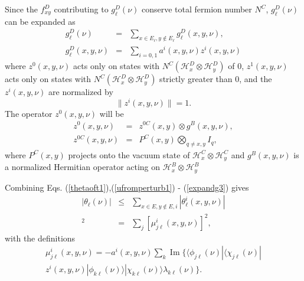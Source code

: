 \documentclass[12pt,amsmath,amssymb,onecolumn]{revtex4-2}
\begin{document}
Since the $f^D_{xy}$ contributing to $g^D_\ell(\nu)$
conserve total fermion number $N^C$,
$g^D_\ell(\nu)$ can be expanded as
\begin{subequations}
\begin{eqnarray}
\label{expandg2}
g^D_{\ell}(\nu) &=& \sum_{x \in E_\ell, y \notin E_\ell} g^D_{\ell}( x, y, \nu),\\
\label{expandg3}
g^D_{\ell}(x,y,\nu) &=& \sum_{i = 0,1} a^i(x, y, \nu) z^i(x, y, \nu)
\end{eqnarray}
\end{subequations}
where $z^0( x, y, \nu)$ acts only on states
with $N^C( \mathcal{H}^D_x \otimes \mathcal{H}^D_y)$ of 0,
$z^1( x, y, \nu)$ acts only on states
with $N^C( \mathcal{H}^D_x \otimes \mathcal{H}^D_y)$ strictly greater than 0,
and the $z^i(x,y,\nu)$ are normalized by 
\begin{equation}
\label{normzi1}
\parallel z^i(x, y, \nu) \parallel   =  1.
\end{equation}
The operator
$z^0(x, y, \nu)$ will be
\begin{subequations}
\begin{eqnarray}
\label{zprojection1}
z^0(x,y,\nu) &=& z^{0C}(x,y) \otimes g^B(x,y,\nu), \\
z^{0C}(x,y,\nu) &=& P^C(x,y) \bigotimes_{q \ne x,y} I_q,
\end{eqnarray}
\end{subequations}
where $P^C(x,y)$ projects onto the vacuum state
of $\mathcal{H}^C_x \otimes \mathcal{H}^C_y$
and $g^B(x,y,\nu)$ is a normalized Hermitian
operator acting on $\mathcal{H}^B_x \otimes \mathcal{H}^B_y$

Combining Eqs. (\ref{thetaoft1}),(\ref{ufromperturb1}) - (\ref{expandg3}) gives
\begin{subequations}
\begin{eqnarray}
\label{thetasum1}
|\theta_\ell(\nu)| &\le& \sum_{x \in E, y \notin E, i}|\theta^i_{\ell}(x,y,\nu)|\\ 
\label{defthetai1}
[\theta^i_{\ell}( x,y,\nu)]^2 & = & \sum_j [ \mu^i_{j\ell}(x,y,\nu)]^2,
\end{eqnarray}
\end{subequations}
with the definitions
\begin{multline}
\label{musupi1}
\mu^i_{j\ell}(x,y,\nu) =  -a^i(x,y,\nu) \sum_k \operatorname{Im}\{ 
 \langle \phi_{j\ell}(\nu)| \langle \chi_{j\ell}(\nu)| \\
z^i(x,y,\nu)|\phi_{k\ell}(\nu) \rangle |\chi_{k\ell}(\nu) \rangle  \lambda_{k\ell}(\nu)\}.
\end{multline}
\end{document}
